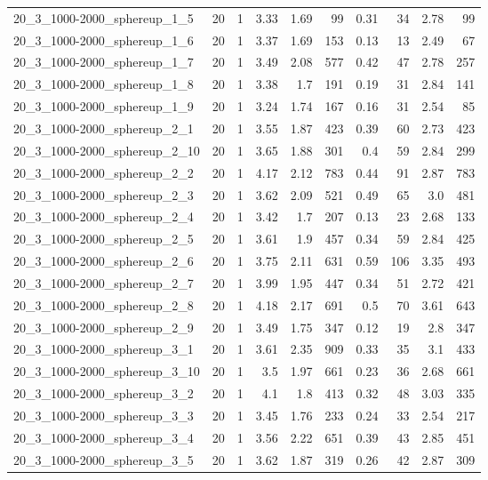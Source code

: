 \begin{center}
\begin{scriptsize}
\begin{longtable}{lrrrrrrrrr}
20\_3\_1000-2000\_sphereup\_1\_5 & 20 & 1 & 3.33 & 1.69 & 99 & 0.31 & 34 & 2.78 & 99\\
20\_3\_1000-2000\_sphereup\_1\_6 & 20 & 1 & 3.37 & 1.69 & 153 & 0.13 & 13 & 2.49 & 67\\
20\_3\_1000-2000\_sphereup\_1\_7 & 20 & 1 & 3.49 & 2.08 & 577 & 0.42 & 47 & 2.78 & 257\\
20\_3\_1000-2000\_sphereup\_1\_8 & 20 & 1 & 3.38 & 1.7 & 191 & 0.19 & 31 & 2.84 & 141\\
20\_3\_1000-2000\_sphereup\_1\_9 & 20 & 1 & 3.24 & 1.74 & 167 & 0.16 & 31 & 2.54 & 85\\
20\_3\_1000-2000\_sphereup\_2\_1 & 20 & 1 & 3.55 & 1.87 & 423 & 0.39 & 60 & 2.73 & 423\\
20\_3\_1000-2000\_sphereup\_2\_10 & 20 & 1 & 3.65 & 1.88 & 301 & 0.4 & 59 & 2.84 & 299\\
20\_3\_1000-2000\_sphereup\_2\_2 & 20 & 1 & 4.17 & 2.12 & 783 & 0.44 & 91 & 2.87 & 783\\
20\_3\_1000-2000\_sphereup\_2\_3 & 20 & 1 & 3.62 & 2.09 & 521 & 0.49 & 65 & 3.0 & 481\\
20\_3\_1000-2000\_sphereup\_2\_4 & 20 & 1 & 3.42 & 1.7 & 207 & 0.13 & 23 & 2.68 & 133\\
20\_3\_1000-2000\_sphereup\_2\_5 & 20 & 1 & 3.61 & 1.9 & 457 & 0.34 & 59 & 2.84 & 425\\
20\_3\_1000-2000\_sphereup\_2\_6 & 20 & 1 & 3.75 & 2.11 & 631 & 0.59 & 106 & 3.35 & 493\\
20\_3\_1000-2000\_sphereup\_2\_7 & 20 & 1 & 3.99 & 1.95 & 447 & 0.34 & 51 & 2.72 & 421\\
20\_3\_1000-2000\_sphereup\_2\_8 & 20 & 1 & 4.18 & 2.17 & 691 & 0.5 & 70 & 3.61 & 643\\
20\_3\_1000-2000\_sphereup\_2\_9 & 20 & 1 & 3.49 & 1.75 & 347 & 0.12 & 19 & 2.8 & 347\\
20\_3\_1000-2000\_sphereup\_3\_1 & 20 & 1 & 3.61 & 2.35 & 909 & 0.33 & 35 & 3.1 & 433\\
20\_3\_1000-2000\_sphereup\_3\_10 & 20 & 1 & 3.5 & 1.97 & 661 & 0.23 & 36 & 2.68 & 661\\
20\_3\_1000-2000\_sphereup\_3\_2 & 20 & 1 & 4.1 & 1.8 & 413 & 0.32 & 48 & 3.03 & 335\\
20\_3\_1000-2000\_sphereup\_3\_3 & 20 & 1 & 3.45 & 1.76 & 233 & 0.24 & 33 & 2.54 & 217\\
20\_3\_1000-2000\_sphereup\_3\_4 & 20 & 1 & 3.56 & 2.22 & 651 & 0.39 & 43 & 2.85 & 451\\
20\_3\_1000-2000\_sphereup\_3\_5 & 20 & 1 & 3.62 & 1.87 & 319 & 0.26 & 42 & 2.87 & 309\\

\end{longtable}
\end{scriptsize}
\end{center}
